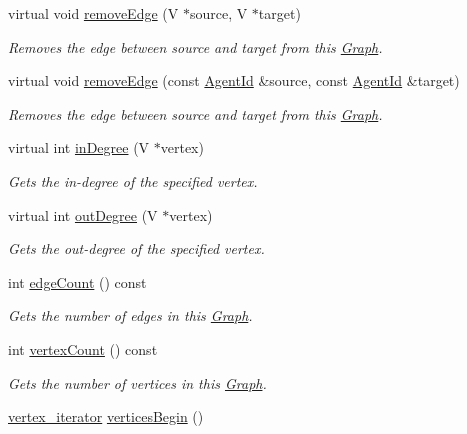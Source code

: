 \begin{DoxyCompactItemize}
virtual void \hyperlink{classrepast_1_1_graph_a95ddd223fa26a5390c13aa1c4fec9254}{remove\-Edge} (V $\ast$source, V $\ast$target)
\begin{DoxyCompactList}\small\item\em Removes the edge between source and target from this \hyperlink{classrepast_1_1_graph}{Graph}. \end{DoxyCompactList}\item 
virtual void \hyperlink{classrepast_1_1_graph_a159360404f97fd8a7339ca98d13151cb}{remove\-Edge} (const \hyperlink{classrepast_1_1_agent_id}{Agent\-Id} \&source, const \hyperlink{classrepast_1_1_agent_id}{Agent\-Id} \&target)
\begin{DoxyCompactList}\small\item\em Removes the edge between source and target from this \hyperlink{classrepast_1_1_graph}{Graph}. \end{DoxyCompactList}\item 
virtual int \hyperlink{classrepast_1_1_graph_a00f9c58855d8ba8ca197f695fdf5c6cc}{in\-Degree} (V $\ast$vertex)
\begin{DoxyCompactList}\small\item\em Gets the in-\/degree of the specified vertex. \end{DoxyCompactList}\item 
virtual int \hyperlink{classrepast_1_1_graph_aeca552decfd6069f132613c1f5aab59d}{out\-Degree} (V $\ast$vertex)
\begin{DoxyCompactList}\small\item\em Gets the out-\/degree of the specified vertex. \end{DoxyCompactList}\item 
int \hyperlink{classrepast_1_1_graph_aaf15eede1ff417d8164f0eb4825cad09}{edge\-Count} () const 
\begin{DoxyCompactList}\small\item\em Gets the number of edges in this \hyperlink{classrepast_1_1_graph}{Graph}. \end{DoxyCompactList}\item 
int \hyperlink{classrepast_1_1_graph_ae9e0b0fc607154387d60596465c8fb80}{vertex\-Count} () const 
\begin{DoxyCompactList}\small\item\em Gets the number of vertices in this \hyperlink{classrepast_1_1_graph}{Graph}. \end{DoxyCompactList}\item 
\hyperlink{classrepast_1_1_graph_acee609459f11e02371ae4d8d226aafab}{vertex\-\_\-iterator} \hyperlink{classrepast_1_1_graph_abbc3dafd7087984a83ac0190e5058c5b}{vertices\-Begin} ()

\end{DoxyCompactItemize}
